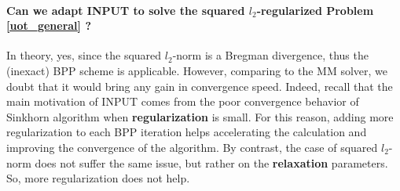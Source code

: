 \paragraph{Can we adapt INPUT to solve the squared $l_2$-regularized Problem \ref{uot_general} ?}
In theory, yes, since the squared $l_2$-norm is a Bregman divergence,
thus the (inexact) BPP scheme is applicable. However, comparing to the MM solver,
we doubt that it would bring any gain in convergence speed. Indeed,
recall that the main motivation of INPUT comes from the poor convergence behavior of Sinkhorn
algorithm when \textbf{regularization} is small. For this reason, adding more regularization
to each BPP iteration helps accelerating the calculation
and improving the convergence of the algorithm. By contrast,
the case of squared $l_2$-norm does not suffer the same issue,
but rather on the \textbf{relaxation} parameters. So, more regularization does not help.